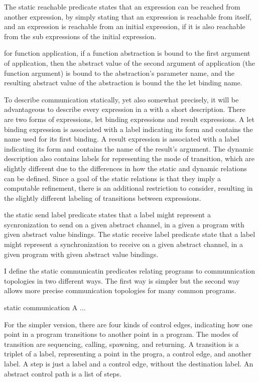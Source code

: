 \documentclass{article}
\begin{document}
The static reachable predicate states that an expression can be reached from another expression, by simply stating that an expression is reachable from itself,  and an expression is reachable from an initial expression, if it is also reachable from the sub expressions of the initial expression.  

for function application, if a function abstraction is bound to the first argument of application, then the abstract value of the second argument of application (the function argument) is bound to the abstraction's parameter name, and the resulting abstract value of the abstraction is bound the the let binding name.

To describe communication statically, yet also somewhat precisely, it will be advantageous to describe every expression in a with a short description.  There are two forms of expressions, let binding expressions and result expressions.  A let binding expression is associated with a label indicating its form and contains the name used for its first binding. A result expression is associated with a label indicating its form and contains the name of the result's argument.  The dynamic description also contains labels for representing the mode of transition, which are slightly different due to the differences in how the static and dynamic relations can be defined.  Since a goal of the static relations is that they imply a computable refinement, there is an additional restriction to consider, resulting in the slightly different labeling of transitions between expressions.    

the static send label predicate states that a label might represent a sycnronization to send on a given abstract channel, in a given a program with given abstract value bindings.  The static receive label predicate state that a label might represent a synchronization to receive on a given abstract channel, in a given program with given abstract value bindings. 






I define the static communicatin predicates relating programs to communnication topologies in two different ways.  The first way is simpler but the second way allows more precise communication topologies for many common programs.


static communication A ...

For the simpler version, there are four kinds of control edges, indicating how one point in a program transitions to another point in a program.  The modes of transition are sequencing, calling, spawning, and returning. 
A transition is a triplet of a label, representing a point in the progra, a control edge, and another label.  A step is just a label and a control edge, without the destination label.  An abstract control path is a list of steps.  
\end{document}

